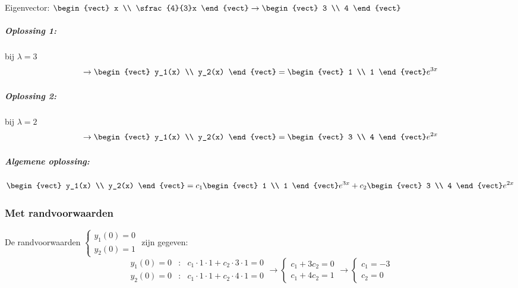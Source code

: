 Eigenvector: $\begin{vect} x \\ \sfrac{4}{3}x \end{vect} \to \begin{vect} 3 \\ 4 \end{vect}$

\subparagraph{Oplossing 1:} bij $\lambda = 3$
\[ \to \begin{vect} y_1(x) \\ y_2(x) \end{vect} = \begin{vect} 1 \\ 1 \end{vect} e^{3x} \]

\subparagraph{Oplossing 2:} bij $\lambda = 2$
\[ \to \begin{vect} y_1(x) \\ y_2(x) \end{vect} = \begin{vect} 3 \\ 4 \end{vect} e^{2x} \]

\subparagraph{Algemene oplossing:}
\[ \begin{vect} y_1(x) \\ y_2(x) \end{vect} = c_1 \begin{vect} 1 \\ 1 \end{vect} e^{3x} + c_2 \begin{vect} 3 \\ 4 \end{vect} e^{2x} \]

\subsubsection{Met randvoorwaarden}
De randvoorwaarden $\left\{\begin{array}{l}
	y_1(0) = 0 \\
	y_2(0) = 1
\end{array}\right.$ zijn gegeven:
\[ \begin{array}{lcr}
	y_1(0) = 0 &:& c_1 \cdot 1 \cdot 1 + c_2 \cdot 3 \cdot 1 = 0 \\
	y_2(0) = 0 &:& c_1 \cdot 1 \cdot 1 + c_2 \cdot 4 \cdot 1 = 0
\end{array} \to \left\{ \begin{array}{r}
	c_1 + 3c_2 = 0 \\
	c_1 + 4c_2 = 1
\end{array}\right. \to \left\{ \begin{array}{l}
	c_1 = -3 \\
	c_2 = 0
\end{array}\right. \]

